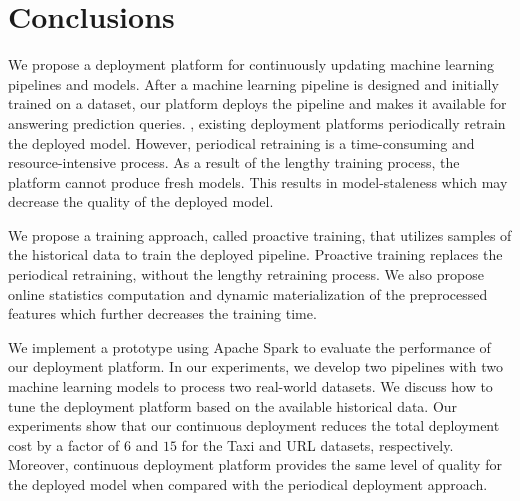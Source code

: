 \section{Conclusions} \label{conclusion}
We propose a deployment platform for continuously updating machine learning pipelines and models.
After a machine learning pipeline is designed and initially trained on a dataset, our platform deploys the pipeline and makes it available for answering prediction queries.
, existing deployment platforms periodically retrain the deployed model.
However, periodical retraining is a time-consuming and resource-intensive process.
As a result of the lengthy training process, the platform cannot produce fresh models.
This results in model-staleness which may decrease the quality of the deployed model.

We propose a training approach, called proactive training, that utilizes samples of the historical data to train the deployed pipeline.
Proactive training replaces the periodical retraining,   without the lengthy retraining process.
We also propose online statistics computation and dynamic materialization of the preprocessed features which further decreases the training time.

We implement a prototype using Apache Spark to evaluate the performance of our deployment platform.
In our experiments, we develop two pipelines with two machine learning models to process two real-world datasets.
We discuss how to tune the deployment platform based on the available historical data.
Our experiments show that our continuous deployment reduces the total deployment cost by a factor of $6$ and $15$ for the Taxi and URL datasets, respectively.
Moreover, continuous deployment platform provides the same level of quality for the deployed model when compared with the periodical deployment approach.

\newline

